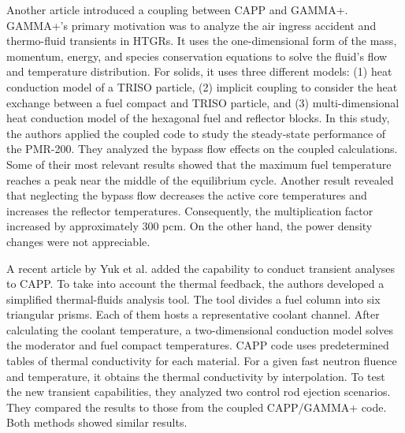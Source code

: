 Another article \cite{tak_cappgamma_2016} introduced a coupling between CAPP and GAMMA+.
GAMMA+'s primary motivation was to analyze the air ingress accident and thermo-fluid transients in \glspl{HTGR}.
It uses the one-dimensional form of the mass, momentum, energy, and species conservation equations to solve the fluid's flow and temperature distribution.
For solids, it uses three different models: (1) heat conduction model of a TRISO particle, (2) implicit coupling to consider the heat exchange between a fuel compact and TRISO particle, and (3) multi-dimensional heat conduction model of the hexagonal fuel and reflector blocks.
In this study, the authors applied the coupled code to study the steady-state performance of the PMR-200.
They analyzed the bypass flow effects on the coupled calculations.
Some of their most relevant results showed that the maximum fuel temperature reaches a peak near the middle of the equilibrium cycle.
Another result revealed that neglecting the bypass flow decreases the active core temperatures and increases the reflector temperatures.
Consequently, the multiplication factor increased by approximately 300 pcm.
On the other hand, the power density changes were not appreciable.

A recent article by Yuk et al. \cite{yuk_time-dependent_2020} added the capability to conduct transient analyses to CAPP.
To take into account the thermal feedback, the authors developed a simplified thermal-fluids analysis tool.
The tool divides a fuel column into six triangular prisms.
Each of them hosts a representative coolant channel.
After calculating the coolant temperature, a two-dimensional conduction model solves the moderator and fuel compact temperatures.
CAPP code uses predetermined tables of thermal conductivity for each material.
For a given fast neutron fluence and temperature, it obtains the thermal conductivity by interpolation.
To test the new transient capabilities, they analyzed two control rod ejection scenarios.
They compared the results to those from the coupled CAPP/GAMMA+ code.
Both methods showed similar results.

